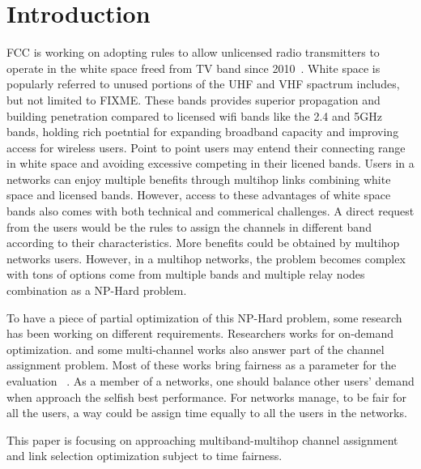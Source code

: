 
\section{Introduction}
\label{sec:introduction}

FCC is working on adopting rules to allow unlicensed radio transmitters to operate in the white space freed from TV band since 2010~\cite{fccwhitespace}. White space is popularly referred to unused portions of the UHF and VHF spactrum includes, but not limited to {FIXME}. These bands provides superior propagation and building penetration compared to licensed wifi bands like the 2.4 and 5GHz bands, holding rich poetntial for expanding broadband capacity and improving access for wireless users. 
Point to point users may entend their connecting range in white space and avoiding excessive competing in their licened bands.
Users in a networks can enjoy multiple benefits through multihop links combining white space and licensed bands. However, access to these advantages of white space bands also comes with both technical and commerical challenges. A direct request from the users would be the rules to assign the channels in different band according to their characteristics. 
More benefits could be obtained by multihop networks users. However, in a multihop networks, the problem becomes complex with tons of options come from multiple bands and multiple relay nodes combination as a NP-Hard problem.


To have a piece of partial optimization of this NP-Hard problem, some research has been working on different requirements. Researchers works for on-demand optimization. and some multi-channel works also answer part of the channel assignment problem. Most of these works bring fairness as a parameter for the evaluation ~\cite{ma2009joint}. 
As a member of a networks, one should balance other users' demand when approach the selfish best performance. For networks manage, to be fair for all the users, a way could be assign time equally to all the users in the networks.

This paper is focusing on approaching multiband-multihop channel assignment and link selection optimization subject to time fairness.


